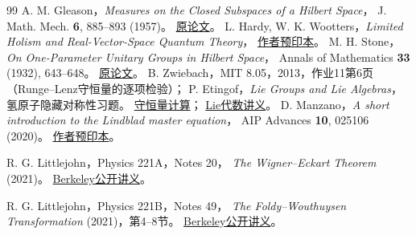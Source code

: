 \begin{thebibliography}{99}
    A. M. Gleason，\textit{Measures on the Closed Subspaces of a Hilbert Space}，
    J. Math. Mech. \textbf{6}, 885--893 (1957)。
    \href{https://mathweb.ucsd.edu/~nwallach/gleasonq.pdf}{原论文}。
    L. Hardy, W. K. Wootters，\textit{Limited Holism and Real-Vector-Space Quantum Theory}，
    \href{https://arxiv.org/abs/1005.4870}{作者预印本}。
    M. H. Stone，\textit{On One-Parameter Unitary Groups in Hilbert Space}，
    Annals of Mathematics \textbf{33} (1932), 643--648。
    \href{https://doi.org/10.2307/1968538}{原论文}。
    B. Zwiebach，MIT 8.05，2013，作业11第6页（Runge--Lenz守恒量的逐项检验）；
    P. Etingof，\textit{Lie Groups and Lie Algebras}，氢原子隐藏对称性习题。
    \href{https://ocw.mit.edu/courses/8-05-quantum-physics-ii-fall-2013/33244de5a887410f525661ddf08e7103_MIT8_05F13_ps11.pdf}{守恒量计算}；
    \href{https://math.mit.edu/~etingof/lnlg.pdf}{Lie代数讲义}。
    D. Manzano，\textit{A short introduction to the Lindblad master equation}，
    AIP Advances \textbf{10}, 025106 (2020)。
    \href{https://arxiv.org/abs/1906.04478}{作者预印本}。

    R. G. Littlejohn，Physics 221A，Notes 20，
    \textit{The Wigner--Eckart Theorem} (2021)。
    \href{https://bohr.physics.berkeley.edu/classes/221/notes/wigeck.pdf}{Berkeley公开讲义}。

    R. G. Littlejohn，Physics 221B，Notes 49，
    \textit{The Foldy--Wouthuysen Transformation} (2021)，第4--8节。
    \href{https://bohr.physics.berkeley.edu/classes/221/notes/foldyw.pdf}{Berkeley公开讲义}。


\end{thebibliography}
